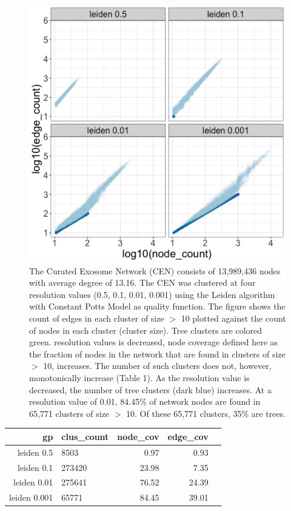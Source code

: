 \documentclass[12pt, oneside]{article}   	%
\begin{document}
\begin{figure}[H]
\centering

\includegraphics[width=0.7\linewidth]{cen_quad_fig1.png}
\caption{The Curated Exosome Network (CEN) consists of 13,989,436 nodes with average degree of 13.16. The CEN was clustered at four resolution values (0.5, 0.1, 0.01, 0.001) using the Leiden algorithm with Constant Potts Model as quality function. The figure shows the count of edges in each cluster of size $>$  10 plotted against the count of nodes in each cluster (cluster size). Tree clusters are colored green.  resolution values is decreased, node coverage defined here as the fraction of nodes in the network that are found in clusters of size $>$  10, increases. The number of such clusters does not, however, monotonically increase (Table 1). As the resolution value is decreased, the number of tree clusters (dark blue) increases. At a resolution value of 0.01, 84.45\% of network nodes are found in 65,771 clusters of size $>$ 10. Of these 65,771 clusters, 35\% are trees.}
\end{figure}

\begin{table}[ht]
\centering
\begin{tabular}{rlrrr}
  \hline
 gp & clus\_count & node\_cov & edge\_cov \\ 
  \hline
leiden 0.5 & 8503 & 0.97 & 0.93 \\ 
leiden 0.1 & 273420 & 23.98 & 7.35 \\ 
leiden 0.01 & 275641 & 76.52 & 24.39 \\   
leiden 0.001 & 65771 & 84.45 & 39.01 \\ 
   \hline
\end{tabular}
\end{table} 
\end{document}
